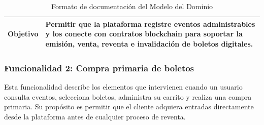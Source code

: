 \documentclass[12pt,letterpaper]{article}
\begin{document}
\begin{table}[H]
\begin{tabularx}{\textwidth}{|p{3.2cm}|X|p{3.5cm}|}
\textbf{Objetivo} & 
\multicolumn{2}{X|}{Permitir que la plataforma registre eventos administrables y los conecte con contratos blockchain para soportar la emisión, venta, reventa e invalidación de boletos digitales.} \\ \hline

\end{tabularx}

\caption{Formato de documentación del Modelo del Dominio}
\label{tab:modelo_dominio_evento_contrato}
\normalsize
\end{table}

\subsubsection{Funcionalidad 2: Compra primaria de boletos}
Esta funcionalidad describe los elementos que intervienen cuando un usuario consulta eventos, selecciona boletos, administra su carrito y realiza una compra primaria. Su propósito es permitir que el cliente adquiera entradas directamente desde la plataforma antes de cualquier proceso de reventa.
\end{document}

